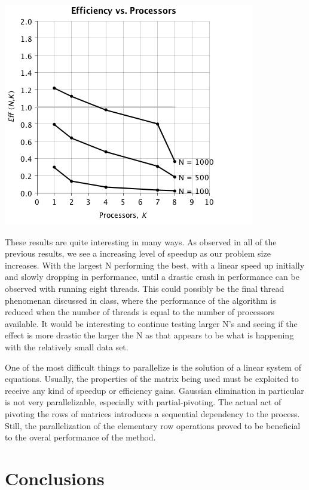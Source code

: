 \documentclass{dependencies/acm_proc_article-sp}
\begin{document}
\begin{center}
\includegraphics[scale=0.5]{images/matrix-inversion/eff-vs-proc.png}
\end{center}

These results are quite interesting in many ways. As observed in all of the
previous results, we see a increasing level of speedup as our problem size
increases. With the largest N performing the best, with a linear
speed up initially and slowly dropping in performance, until a drastic
crash in performance can be observed with running eight threads. This could
possibly be the final thread phenomenan discussed in class, where the
performance of the algorithm is reduced when the number of threads is equal
to the number of processors available. It would be interesting to continue
testing larger N's and seeing if the effect is more drastic the larger the N
as that appears to be what is happening with the relatively small data set.

One of the most difficult things to parallelize is the solution of a linear 
system of equations. Usually, the properties of the matrix being used must 
be exploited to receive any kind of speedup or efficiency gains. Gaussian 
elimination in particular is not very parallelizable, especially with 
partial-pivoting. The actual act of pivoting the rows of matrices introduces 
a sequential dependency to the process. Still, the parallelization of the 
elementary row operations proved to be beneficial to the overal performance 
of the method. 

\section{Conclusions}
\end{document}
